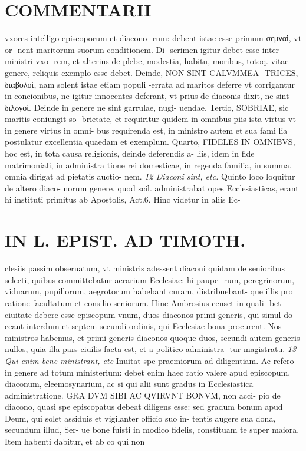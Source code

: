 \documentclass{article}
\begin{document}
\begin{pages}
\section*{COMMENTARII }\pstart vxores intelligo episcoporum et diacono- rum: debent istae esse primum σεμναὶ, vt or- nent maritorum suorum conditionem. Di- scrimen igitur debet esse inter ministri vxo- rem, et alterius de plebe, modestia, habitu, moribus, totoq. vitae genere, reliquis exemplo esse debet. Deinde, NON SINT CALVMMEA- TRICES, διαβολοὶ, nam solent istae etiam populi -errata ad maritos deferre vt corrigantur in concionibus, ne igitur innocentes deferant, vt prius de diaconis dixit, ne sint διλoγοί. Deinde in genere ne sint garrulae, nugi- uendae.  \pend\pstart Tertio, SOBRIAE, sic maritis coniungit so- brietate, et requiritur quidem in omnibus piis ista virtus vt in genere virtus in omni- bus requirenda est, in ministro autem et sua fami lia postulatur excellentia quaedam et exemplum.  \pend\pstart Quarto, FIDELES IN OMNIBVS, hoc est, in tota causa religionis, deinde deferendis a- liis, idem in fide matrimoniali, in administra tione rei domesticae, in regenda familia, in summa, omnia dirigat ad pietatis auctio- nem.  \pend
\textit{12 Diaconi sint, etc. }\pstart Quinto loco loquitur de altero diaco- norum genere, quod scil. administrabat opes Ecclesiasticas, erant hi instituti primitus ab Apostolis, Act.6. Hinc videtur in aliis Ec-  \pend
\section*{IN L. EPIST. AD TIMOTH. }
\marginpar{[ p.75 ]}\pstart clesiis passim obseruatum, vt ministris adessent diaconi quidam de senioribus selecti, quibus committebatur aerarium Ecclesiae: hi paupe- rum, peregrinorum, viduarum, pupillorum, aegrotorum habebant curam, distribuebant- que illis pro ratione facultatum et consilio seniorum. Hinc Ambrosius censet in quali- bet ciuitate debere esse episcopum vnum, duos diaconos primi generis, qui simul do ceant interdum et septem secundi ordinis, qui Ecclesiae bona procurent. Nos ministros habemus, et primi generis diaconos quoque duos, secundi autem generis nullos, quia illa pars ciuilis facta est, et a politico administra- tur magistratu.  \pend
\textit{13 Qui enim bene ministrant, etc }\pstart Inuitat spe praemiorum ad diligentiam. Ac refero in genere ad totum ministerium: debet enim haec ratio valere apud episcopum, diaconum, eleemosynarium, ac si qui alii sunt gradus in Ecclesiastica administratione. GRA DVM SIBI AC QVIRVNT BONVM, non acci- pio de diacono, quasi spe episcopatus debeat diligens esse: sed gradum bonum apud Deum, qui solet assiduis et vigilanter officio suo in- tentis augere sua dona, secundum illud, Ser- ue bone fuisti in modico fidelis, constituam te super maiora.  \pend\pstart Item habenti dabitur, et ab co qui non  \pend
\marginpar{[ p.76 ]}

\end{pages}
\end{document}
